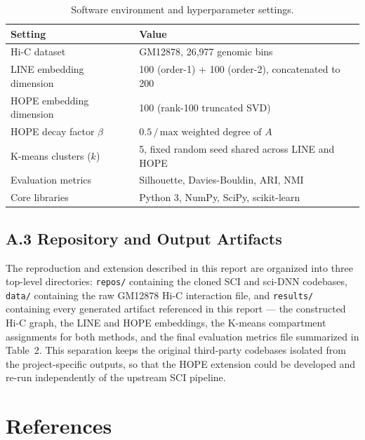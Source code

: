 \documentclass[12pt]{article}
\begin{document}
\begin{table}[h]
\centering
\caption{Software environment and hyperparameter settings.}
\label{tab:env}
\begin{tabular}{ll}
\toprule
\textbf{Setting} & \textbf{Value} \\
\midrule
Hi-C dataset & GM12878, 26{,}977 genomic bins \\
LINE embedding dimension & 100 (order-1) + 100 (order-2), concatenated to 200 \\
HOPE embedding dimension & 100 (rank-100 truncated SVD) \\
HOPE decay factor $\beta$ & $0.5 \,/\, \text{max weighted degree of } A$ \\
K-means clusters ($k$) & 5, fixed random seed shared across LINE and HOPE \\
Evaluation metrics & Silhouette, Davies-Bouldin, ARI, NMI \\
Core libraries & Python 3, NumPy, SciPy, scikit-learn \\
\bottomrule
\end{tabular}
\end{table}

\subsection*{A.3 Repository and Output Artifacts}
The reproduction and extension described in this report are organized into three top-level
directories: \texttt{repos/} containing the cloned SCI and sci-DNN codebases, \texttt{data/}
containing the raw GM12878 Hi-C interaction file, and \texttt{results/} containing every
generated artifact referenced in this report — the constructed Hi-C graph, the LINE and HOPE
embeddings, the K-means compartment assignments for both methods, and the final evaluation
metrics file summarized in Table~2. This separation keeps the original third-party codebases
isolated from the project-specific outputs, so that the HOPE extension could be developed and
re-run independently of the upstream SCI pipeline.

\section{References}
\end{document}
